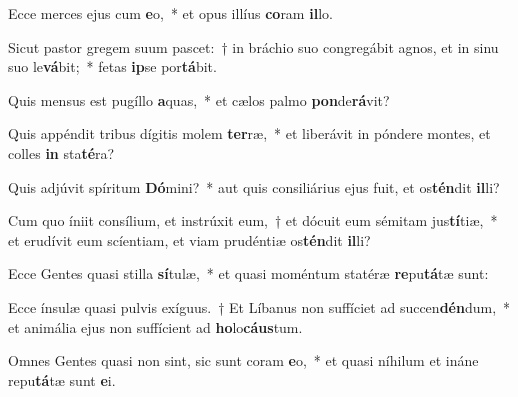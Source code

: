 \item Ecce merces ejus cum \textbf{e}o,~* et opus illíus \textbf{co}ram \textbf{il}lo.
\item Sicut pastor gregem suum pascet:~† in bráchio suo congregábit agnos, et in sinu suo le\textbf{vá}bit;~* fetas \textbf{ip}se por\textbf{tá}bit.
\item Quis mensus est pugíllo \textbf{a}quas,~* et cælos palmo \textbf{pon}de\textbf{rá}vit?
\item Quis appéndit tribus dígitis molem \textbf{ter}ræ,~* et liberávit in póndere montes, et colles \textbf{in} sta\textbf{té}ra?
\item Quis adjúvit spíritum \textbf{Dó}mini?~* aut quis consiliárius ejus fuit, et os\textbf{tén}dit \textbf{il}li?
\item Cum quo íniit consílium, et instrúxit eum,~† et dócuit eum sémitam jus\textbf{tí}tiæ,~* et erudívit eum scíentiam, et viam prudéntiæ os\textbf{tén}dit \textbf{il}li?
\item Ecce Gentes quasi stilla \textbf{sí}tulæ,~* et quasi moméntum statéræ \textbf{re}pu\textbf{tá}tæ sunt:
\item Ecce ínsulæ quasi pulvis exíguus.~† Et Líbanus non suffíciet ad succen\textbf{dén}dum,~* et animália ejus non suffícient ad \textbf{ho}lo\textbf{cáus}tum.
\item Omnes Gentes quasi non sint, sic sunt coram \textbf{e}o,~* et quasi níhilum et ináne repu\textbf{tá}tæ sunt \textbf{e}i.
